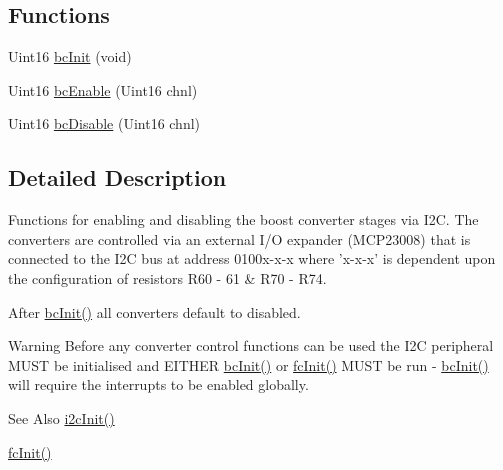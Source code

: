 \subsection*{Functions}
\begin{DoxyCompactItemize}
\item 
Uint16 \hyperlink{a00008_aa6cb02a7aacce8671212b21ed6e39863}{bc\-Init} (void)
\item 
Uint16 \hyperlink{a00008_af10c5e095b6142ee37930042bd1da708}{bc\-Enable} (Uint16 chnl)
\item 
Uint16 \hyperlink{a00008_a3df6954c93c9089cdc750fff4b89da3e}{bc\-Disable} (Uint16 chnl)
\end{DoxyCompactItemize}


\subsection{Detailed Description}
Functions for enabling and disabling the boost converter stages via I2\-C. The converters are controlled via an external I/\-O expander (M\-C\-P23008) that is connected to the I2\-C bus at address 0100x-\/x-\/x where 'x-\/x-\/x' is dependent upon the configuration of resistors R60 -\/ 61 \& R70 -\/ R74.

After \hyperlink{a00008_aa6cb02a7aacce8671212b21ed6e39863}{bc\-Init()} all converters default to disabled.

\begin{DoxyWarning}{Warning}
Before any converter control functions can be used the I2\-C peripheral M\-U\-S\-T be initialised and E\-I\-T\-H\-E\-R \hyperlink{a00008_aa6cb02a7aacce8671212b21ed6e39863}{bc\-Init()} or \hyperlink{a00017_a3506b5e25346351ce292e2ad256607cc}{fc\-Init()} M\-U\-S\-T be run -\/ \hyperlink{a00008_aa6cb02a7aacce8671212b21ed6e39863}{bc\-Init()} will require the interrupts to be enabled globally.
\end{DoxyWarning}
\begin{DoxySeeAlso}{See Also}
\hyperlink{a00019_a1e0a81a1ad1fd7710ca189236e3e5476}{i2c\-Init()} 

\hyperlink{a00017_a3506b5e25346351ce292e2ad256607cc}{fc\-Init()} 
\end{DoxySeeAlso}


